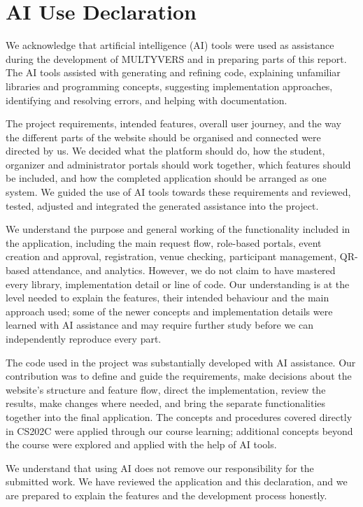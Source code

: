 \documentclass[11pt,a4paper]{article}
\begin{document}
\section*{AI Use Declaration}

We acknowledge that artificial intelligence (AI) tools were used as assistance
during the development of MULTYVERS and in preparing parts of this report.
The AI tools assisted with generating and refining code, explaining unfamiliar
libraries and programming concepts, suggesting implementation approaches,
identifying and resolving errors, and helping with documentation.

The project requirements, intended features, overall user journey, and the
way the different parts of the website should be organised and connected were
directed by us. We decided what the platform should do, how the student,
organizer and administrator portals should work together, which features
should be included, and how the completed application should be arranged as
one system. We guided the use of AI tools towards these requirements and
reviewed, tested, adjusted and integrated the generated assistance into the
project.

We understand the purpose and general working of the functionality included
in the application, including the main request flow, role-based portals,
event creation and approval, registration, venue checking, participant
management, QR-based attendance, and analytics. However, we do not claim to
have mastered every library, implementation detail or line of code. Our
understanding is at the level needed to explain the features, their intended
behaviour and the main approach used; some of the newer concepts and
implementation details were learned with AI assistance and may require
further study before we can independently reproduce every part.

The code used in the project was substantially developed with AI assistance.
Our contribution was to define and guide the requirements, make decisions
about the website's structure and feature flow, direct the implementation,
review the results, make changes where needed, and bring the separate
functionalities together into the final application. The concepts and
procedures covered directly in CS202C were applied through our course
learning; additional concepts beyond the course were explored and applied
with the help of AI tools.

We understand that using AI does not remove our responsibility for the
submitted work. We have reviewed the application and this declaration, and
we are prepared to explain the features and the development process honestly.
\end{document}
